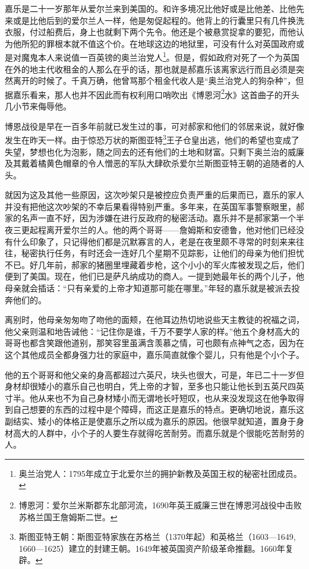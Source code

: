 \par  
\par 嘉乐是二十一岁那年从爱尔兰来到美国的。和许多境况比他好或是比他差、比他先来或是比他后到的爱尔兰人一样，他是匆促起程的。他背上的行囊里只有几件换洗衣服，付过船费后，身上也就剩下两个先令。他还是个被悬赏捉拿的要犯，而他认为他所犯的罪根本就不值这个价。在地球这边的地狱里，可没有什么对英国政府或是对魔鬼本人来说值一百英镑的奥兰治党人\footnote{奥兰治党人：1795年成立于北爱尔兰的拥护新教及英国王权的秘密社团成员。}。但是，假如政府对死了一个为英国在外的地主代收租金的人那么在乎的话，那也就是郝嘉乐该离家远行而且必须是突然离开的时候了。千真万确，他曾骂那个租金代收人是“奥兰治党人的狗杂种”，但据嘉乐看来，那人也并不因此而有权利用口哨吹出《博恩河\footnote{博恩河：爱尔兰米斯郡东北部河流，1690年英王威廉三世在博恩河战役中击败苏格兰国王詹姆斯二世。}水》这首曲子的开头几小节来侮辱他。
\par 博恩战役是早在一百多年前就已发生过的事，可对郝家和他们的邻居来说，就好像发生在昨天一样。由于惊恐万状的斯图亚特\footnote{斯图亚特王朝：斯图亚特家族在苏格兰（1370年起）和英格兰（1603—1649, 1660—1625）建立的封建王朝。1649年被英国资产阶级革命推翻。1660年复辟。}王子仓皇出逃，他们的希望也变成了失望，梦想也化为泡影，随之同去的还有他们的土地和财富。只剩下奥兰治的威廉及其戴着橘黄色帽章的令人憎恶的军队大肆砍杀爱尔兰斯图亚特王朝的追随者的人头。
\par 就因为这及其他一些原因，这次吵架只是被控应负责严重的后果而已，嘉乐的家人并没有把他这次吵架的不幸后果看得特别严重。多年来，在英国军事警察眼里，郝家的名声一直不好，因为涉嫌在进行反政府的秘密活动。嘉乐并不是郝家第一个半夜三更起程离开爱尔兰的人。他的两个哥哥——詹姆斯和安德鲁，他对他们已经没有什么印象了，只记得他们都是沉默寡言的人，老是在夜里颇不寻常的时刻来来往往，秘密执行任务，有时还会一连好几个星期不见踪影，让他们的母亲为他们担忧不已。好几年前，郝家的猪圈里埋藏着步枪，这个小小的军火库被发现之后，他们便到了美国。现在，他们已是萨凡纳成功的商人。一提到她最年长的两个儿子，他母亲就会插话：“只有亲爱的上帝才知道那可能在哪里。”年轻的嘉乐就是被派去投奔他们的。
\par 离别时，他母亲匆匆吻了吻他的面颊，在他耳边热切地说些天主教徒的祝福之词，他父亲则温和地告诫他：“记住你是谁，千万不要学人家的样。”他五个身材高大的哥哥也都含笑跟他道别，那笑容里虽满含羡慕之情，可也颇有点神气之态，因为在这个其他成员全都身强力壮的家庭中，嘉乐简直就像个婴儿，只有他是个小个子。
\par 他的五个哥哥和他父亲的身高都超过六英尺，块头也很大，可是，年已二十一岁但身材却很矮小的嘉乐自己也明白，凭上帝的才智，至多也只能让他长到五英尺四英寸半。他从来也不为自己身材矮小而无谓地长吁短叹，也从来没发现这在他争取得到自己想要的东西的过程中是个障碍，而这正是嘉乐的特点。更确切地说，嘉乐这副结实、矮小的体格正是使嘉乐之所以成为嘉乐的原因。他很早就知道，置身于身材高大的人群中，小个子的人要生存就得吃苦耐劳。而嘉乐就是个很能吃苦耐劳的人。
